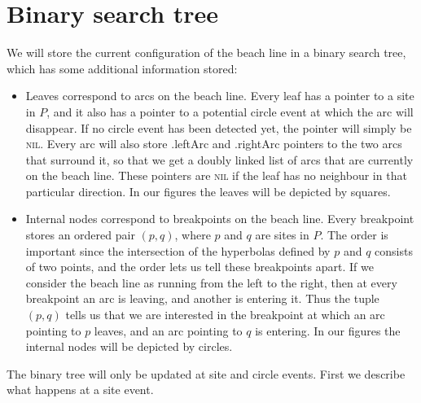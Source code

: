 \section{Binary search tree}
We will store the current configuration of the beach line in a binary search tree, which has some additional information stored:
\begin{itemize}
    \item Leaves correspond to arcs on the beach line. Every leaf has a pointer to a site in $P$, and it also has a pointer to a potential circle event at which the arc will disappear. If no circle event has been detected yet, the pointer will simply be \textsc{nil}. Every arc will also store \textsf{.leftArc} and \textsf{.rightArc} pointers to the two arcs that surround it, so that we get a doubly linked list of arcs that are currently on the beach line. These pointers are \textsc{nil} if the leaf has no neighbour in that particular direction. In our figures the leaves will be depicted by squares.
    
    \item Internal nodes correspond to breakpoints on the beach line. Every breakpoint stores an ordered pair $(p, q)$, where $p$ and $q$ are sites in $P$. The order is important since the intersection of the hyperbolas defined by $p$ and $q$ consists of two points, and the order lets us tell these breakpoints apart. If we consider the beach line as running from the left to the right, then at every breakpoint an arc is leaving, and another is entering it. Thus the tuple $(p, q)$ tells us that we are interested in the breakpoint at which an arc pointing to $p$ leaves, and an arc pointing to $q$ is entering. In our figures the internal nodes will be depicted by circles.
\end{itemize}

The binary tree will only be updated at site and circle events. First we describe what happens at a site event.


